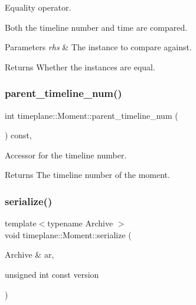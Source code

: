 Equality operator. 

Both the timeline number and time are compared. 
\begin{DoxyParams}{Parameters}
{\em rhs} & The instance to compare against. \\
\hline
\end{DoxyParams}
\begin{DoxyReturn}{Returns}
Whether the instances are equal. 
\end{DoxyReturn}
\mbox{\label{classtimeplane_1_1_moment_ad8ea04fc7e079694a0843ff7b3f42c6c}} 
\subsubsection{\texorpdfstring{parent\+\_\+timeline\+\_\+num()}{parent\_timeline\_num()}}
{\footnotesize\ttfamily int timeplane\+::\+Moment\+::parent\+\_\+timeline\+\_\+num (\begin{DoxyParamCaption}{ }\end{DoxyParamCaption}) const\hspace{0.3cm}{\ttfamily [inline]}, {\ttfamily [noexcept]}}



Accessor for the timeline number. 

\begin{DoxyReturn}{Returns}
The timeline number of the moment. 
\end{DoxyReturn}
\mbox{\label{classtimeplane_1_1_moment_ac7870eb30ed18b8ea85bf7584632cd11}} 
\subsubsection{\texorpdfstring{serialize()}{serialize()}}
{\footnotesize\ttfamily template$<$typename Archive $>$ \\
void timeplane\+::\+Moment\+::serialize (\begin{DoxyParamCaption}\item[{Archive \&}]{ar,  }\item[{unsigned int const}]{version }\end{DoxyParamCaption})\hspace{0.3cm}{\ttfamily [inline]}}



